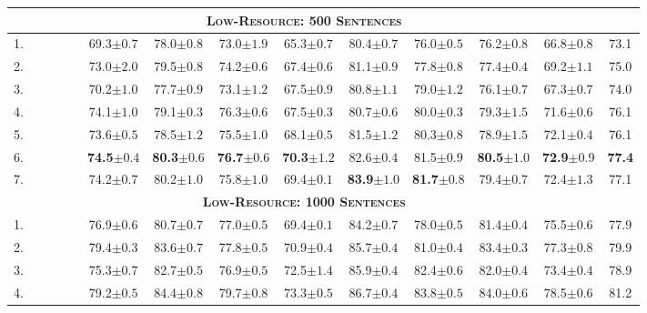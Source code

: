 \documentclass[11pt,a4paper]{article}
\newcommand{\cmark}{\textcolor{blue}{\ding{51}}}
\newcommand{\xmark}{\textcolor{red}{\ding{55}}}
\begin{document}
\begin{table*}[t]
\begin{tabular}{l|cccc||cccccccc|c}
\hline\hline
\multicolumn{13}{c}{\bf \textsc{Low-Resource: 500 Sentences}}\\
\hline
1. & \xmark & \cmark & \xmark & \xmark & 69.3$\pm0.7$ & 78.0$\pm0.8$ & 73.0$\pm1.9$ & 65.3$\pm0.7$ & 80.4$\pm0.7$ & 76.0$\pm0.5$ & 76.2$\pm0.8$ & 66.8$\pm0.8$ & 73.1 \\
2. & \xmark & \cmark & \cmark & \xmark & 73.0$\pm2.0$ & 79.5$\pm0.8$ & 74.2$\pm0.6$ & 67.4$\pm0.6$ & 81.1$\pm0.9$ & 77.8$\pm0.8$ & 77.4$\pm0.4$ & 69.2$\pm1.1$ & 75.0 \\
3. & \cmark & \xmark & \xmark & \xmark & 70.2$\pm1.0$ & 77.7$\pm0.9$ & 73.1$\pm1.2$ & 67.5$\pm0.9$ & 80.8$\pm1.1$ & 79.0$\pm1.2$ & 76.1$\pm0.7$ & 67.3$\pm0.7$ & 74.0 \\
4. & \cmark & \xmark & \cmark & \xmark & 74.1$\pm1.0$ & 79.1$\pm0.3$ & 76.3$\pm0.6$ & 67.5$\pm0.3$ & 80.7$\pm0.6$ & 80.0$\pm0.3$ & 79.3$\pm1.5$ & 71.6$\pm0.6$ & 76.1 \\
5. & \cmark & \xmark & \cmark & \cmark & 73.6$\pm0.5$ & 78.5$\pm1.2$ & 75.5$\pm1.0$ & 68.1$\pm0.5$ & 81.5$\pm1.2$ & 80.3$\pm0.8$ & 78.9$\pm1.5$ & 72.1$\pm0.4$ & 76.1 \\
6. & \cmark & \cmark & \cmark & \xmark & \textbf{74.5}$\pm0.4$ & \textbf{80.3}$\pm0.6$ & \textbf{76.7}$\pm0.6$ & \textbf{70.3}$\pm1.2$ & 82.6$\pm0.4$ & 81.5$\pm0.9$ & \textbf{80.5}$\pm1.0$ & \textbf{72.9}$\pm0.9$ & \textbf{77.4} \\
7. & \cmark & \cmark & \cmark & \cmark & 74.2$\pm0.7$ & 80.2$\pm1.0$ & 75.8$\pm1.0$ & 69.4$\pm0.1$ & \textbf{83.9}$\pm1.0$ & \textbf{81.7}$\pm0.8$ & 79.4$\pm0.7$ & 72.4$\pm1.3$ & 77.1 \\
\hline\hline
\multicolumn{13}{c}{\bf \textsc{Low-Resource: 1000 Sentences}}\\
\hline
1. & \xmark & \cmark & \xmark & \xmark & 76.9$\pm0.6$ & 80.7$\pm0.7$ & 77.0$\pm0.5$ & 69.4$\pm0.1$ & 84.2$\pm0.7$ & 78.0$\pm0.5$ & 81.4$\pm0.4$ & 75.5$\pm0.6$ & 77.9 \\
2. & \xmark & \cmark & \cmark & \xmark & 79.4$\pm0.3$ & 83.6$\pm0.7$ & 77.8$\pm0.5$ & 70.9$\pm0.4$ & 85.7$\pm0.4$ & 81.0$\pm0.4$ & 83.4$\pm0.3$ & 77.3$\pm0.8$ & 79.9 \\
3. & \cmark & \xmark & \xmark & \xmark & 75.3$\pm0.7$ & 82.7$\pm0.5$ & 76.9$\pm0.5$ & 72.5$\pm1.4$ & 85.9$\pm0.4$ & 82.4$\pm0.6$ & 82.0$\pm0.4$ & 73.4$\pm0.4$ & 78.9 \\
4. & \cmark & \xmark & \cmark & \xmark & 79.2$\pm0.5$ & 84.4$\pm0.8$ & 79.7$\pm0.8$ & 73.3$\pm0.5$ & 86.7$\pm0.4$ & 83.8$\pm0.5$ & 84.0$\pm0.6$ & 78.5$\pm0.6$ & 81.2 \\

\end{tabular}
\end{table*}
\end{document}
